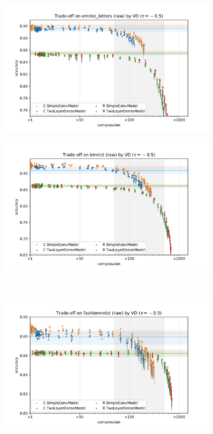 \documentclass[a4paper,10pt,onecolumn]{article}
\begin{document}
\begin{figure}[b]
  \centering
  \begin{subfigure}[b]{0.5\columnwidth}
    \centering
    \includegraphics[width=\linewidth]{figure__mnist-like__trade-off/legacy__VD__emnist_letters__raw__-0.5.pdf}
  \end{subfigure}%
  \begin{subfigure}[b]{0.5\columnwidth}
    \centering
    \includegraphics[width=\linewidth]{figure__mnist-like__trade-off/legacy__VD__kmnist__raw__-0.5.pdf}
  \end{subfigure} \\%
  \begin{subfigure}[b]{0.5\columnwidth}
    \centering
    \includegraphics[width=\linewidth]{figure__mnist-like__trade-off/legacy__VD__fashionmnist__raw__-0.5.pdf}

\end{subfigure}
\end{figure}
\end{document}
